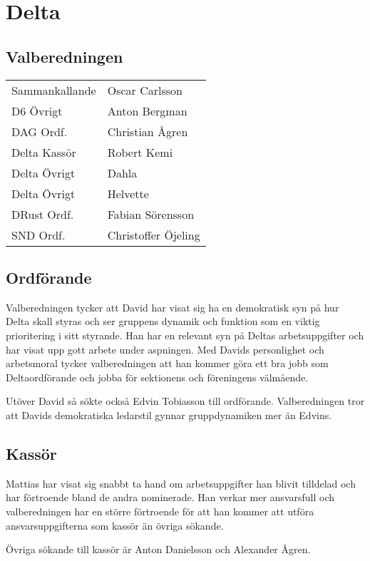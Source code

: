 \section{Delta}

\subsection{Valberedningen}
\begin{autoframe}
\begin{tabular}{ll}

Sammankallande & Oscar Carlsson \\
D6 Övrigt & Anton Bergman \\
DAG Ordf. & Christian Ågren \\
Delta Kassör & Robert Kemi \\
Delta Övrigt & Dahla \\
Delta Övrigt & Helvette \\
DRust Ordf. & Fabian Sörensson \\
SND Ordf. & Christoffer Öjeling
\end{tabular}

\end{autoframe}

\subsection{Ordförande}
\begin{autoframe}

Valberedningen tycker att David har visat sig ha en demokratisk syn på hur Delta skall styras och ser gruppens dynamik och funktion som en viktig prioritering i sitt styrande. Han har en relevant syn på Deltas arbetsuppgifter och har visat upp gott arbete under aspningen. Med Davids personlighet och arbetsmoral tycker valberedningen att han kommer göra ett bra jobb som Deltaordförande och jobba för sektionens och föreningens välmående.
\bigskip

Utöver David så sökte också Edvin Tobiasson till ordförande. Valberedningen tror att Davids demokratiska ledarstil gynnar gruppdynamiken mer än Edvins.
\end{autoframe}

\subsection{Kassör}
\begin{autoframe}

Mattias har visat sig snabbt ta hand om arbetsuppgifter han blivit tilldelad och har förtroende bland de andra nominerade. Han verkar mer ansvarsfull och valberedningen har en större förtroende för att han kommer att utföra ansvarsuppgifterna som kassör än övriga sökande.

\bigskip
Övriga sökande till kassör är Anton Danielsson och Alexander Ågren.
\end{autoframe}

